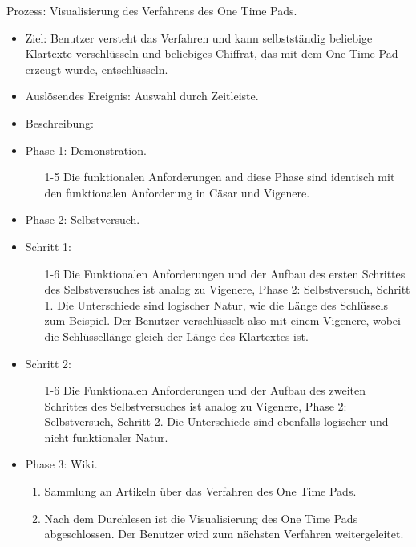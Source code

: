 \documentclass{article}
\begin{document}
\begin{FA}[start=800]
 \item Prozess: Visualisierung des Verfahrens des One Time Pads.
\end{FA}
\begin{itemize}[label={}]

 \item Ziel: Benutzer versteht das Verfahren und kann selbstständig beliebige Klartexte verschlüsseln und beliebiges Chiffrat, das mit dem One Time Pad erzeugt wurde, entschlüsseln.

 \item Auslösendes Ereignis: Auswahl durch Zeitleiste.

 \item Beschreibung:

 \item Phase 1: Demonstration.

	\begin{enumerate}[]
 	 \item[1-5] Die funktionalen Anforderungen and diese Phase sind identisch mit den 
            funktionalen Anforderung in Cäsar und Vigenere.
	\end{enumerate}

 \item Phase 2: Selbstversuch.

 \item Schritt 1:

	\begin{enumerate}
	 \item[1-6] Die Funktionalen Anforderungen und der Aufbau des ersten 
Schrittes des Selbstversuches ist analog zu Vigenere, Phase 2: Selbstversuch, 
Schritt 1. Die Unterschiede sind logischer Natur, wie die Länge des 
Schlüssels zum Beispiel. Der Benutzer verschlüsselt also mit einem 
Vigenere, wobei die Schlüssellänge gleich der Länge des Klartextes ist.
	\end{enumerate}

 \item Schritt 2:

	\begin{enumerate}
	 \item[1-6] Die Funktionalen Anforderungen und der Aufbau des zweiten 
Schrittes des Selbstversuches ist analog zu Vigenere, Phase 2: Selbstversuch, 
Schritt 2. Die Unterschiede sind ebenfalls logischer und nicht funktionaler Natur.
	\end{enumerate}

 \item Phase 3: Wiki.

	\begin{enumerate}
	 \item Sammlung an Artikeln über das Verfahren des One Time Pads.
	 \item Nach dem Durchlesen ist die Visualisierung des One Time Pads abgeschlossen. Der Benutzer wird zum nächsten Verfahren weitergeleitet.
 	\end{enumerate}

\end{itemize}
\end{document}
